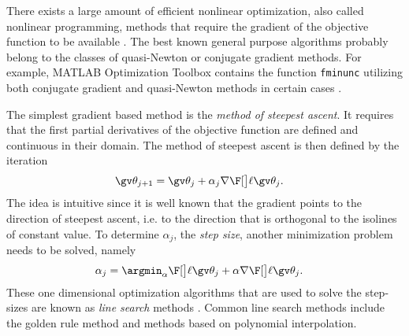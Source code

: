 
There exists a large amount of efficient nonlinear optimization,
also called nonlinear programming, methods that require the gradient of the 
objective function to be available \parencite{luenberger2008}.
The best known general purpose algorithms probably belong to the 
classes of quasi-Newton or conjugate gradient methods. 
For example, MATLAB Optimization Toolbox contains the function
\texttt{fminunc} utilizing both conjugate gradient and 
quasi-Newton methods in certain cases \parencite{fminunc}.

The simplest gradient based method is the \emph{method of steepest ascent}.
It requires that the first partial derivatives of the objective function are defined
and continuous in their domain. The method of steepest ascent is then defined
by the iteration
\begin{align}
	\Th_{j+1}&=\Th_j+\alpha_j\nabla\lLH[\Th_j].
	\label{eq:steepest_descent}
\end{align}
The idea is intuitive since it is well known that the gradient
points to the direction of steepest ascent, i.e. to the direction
that is orthogonal to the isolines of constant value.
To determine $\alpha_j$, the \emph{step size}, another minimization problem needs to be solved,
namely
\begin{align}
	\alpha_j &= \argmin_\alpha \lLH[\Th_j+\alpha\nabla\lLH[\Th_j]].
	\label{eq:line_search}
\end{align}
These one dimensional optimization algorithms that are used
to solve the step-sizes are known as \emph{line search} methods \parencite{luenberger2008}.
Common line search methods include the golden rule method and 
methods based on polynomial interpolation.

